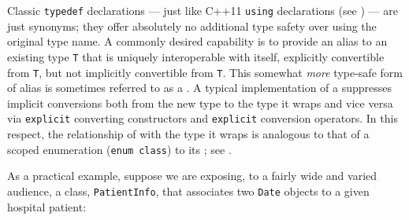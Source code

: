 Classic \lstinline!typedef! declarations --- just like C++11
\lstinline!using! declarations (see )
--- are just synonyms; they
offer absolutely no additional type safety over using the original type name. A commonly desired capability is to
provide an alias to an existing type \lstinline!T! that is uniquely
interoperable with itself, explicitly convertible from \lstinline!T!, but
not implicitly convertible from \lstinline!T!. This somewhat \emph{more}
type-safe form of alias is sometimes referred to as a . A typical implementation of a  suppresses implicit conversions both from the new type to the type it wraps and vice versa via \lstinline!explicit! converting constructors and \lstinline!explicit! conversion operators.  In this respect, the relationship of  with the type it wraps is analogous to that of a scoped enumeration (\lstinline!enum!~\lstinline!class!)  to its ; see .

As a practical example, suppose we are exposing, to a fairly wide and varied audience, a class,
\lstinline!PatientInfo!, that associates two \lstinline!Date! objects to a
given hospital patient:

